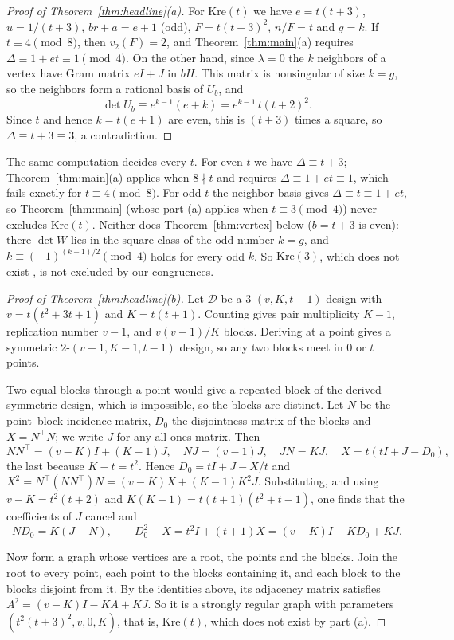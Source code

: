 \documentclass[11pt]{article}
\theoremstyle{definition}
\theoremstyle{remark}
\newcommand{\Kre}{\mathrm{Kre}}
\begin{document}
\begin{proof}[Proof of Theorem~\ref{thm:headline}(a)]
For $\Kre(t)$ we have $e=t(t+3)$, $u=1/(t+3)$, $br+a=e+1$ (odd),
$F=t(t+3)^2$, $n/F=t$ and $g=k$. If $t\equiv4\pmod 8$, then $v_2(F)=2$, and
Theorem~\ref{thm:main}(a) requires $\Delta\equiv1+et\equiv1\pmod 4$.
On the other hand, since $\lambda=0$ the $k$ neighbors of a vertex have Gram
matrix $eI+J$ in $bH$. This matrix is nonsingular of size $k=g$, so the
neighbors form a rational basis of $U_b$, and
\[
 \det U_b\equiv e^{k-1}(e+k)=e^{k-1}\,t(t+2)^2 .
\]
Since $t$ and hence $k=t(e+1)$ are even, this is $(t+3)$ times a square, so
$\Delta\equiv t+3\equiv3$, a contradiction.
\end{proof}

The same computation decides every $t$. For even $t$ we have
$\Delta\equiv t+3$; Theorem~\ref{thm:main}(a) applies when $8\nmid t$ and
requires $\Delta\equiv1+et\equiv1$, which fails exactly for $t\equiv4\pmod 8$.
For odd $t$ the neighbor basis gives $\Delta\equiv t\equiv1+et$, so
Theorem~\ref{thm:main} (whose part (a) applies when $t\equiv3\pmod 4$) never excludes
$\Kre(t)$. Neither does Theorem~\ref{thm:vertex} below ($b=t+3$ is even):
there $\det W$ lies in the square class of the odd number $k=g$, and
$k\equiv(-1)^{(k-1)/2}\pmod 4$ holds for every odd $k$. So $\Kre(3)$, which
does not exist \cite{GM,KO}, is not excluded by our congruences.

\begin{proof}[Proof of Theorem~\ref{thm:headline}(b)]
Let $\mathcal D$ be a $3$-$(v,K,t-1)$ design with $v=t(t^2+3t+1)$ and
$K=t(t+1)$. Counting gives pair multiplicity $K-1$, replication number $v-1$,
and $v(v-1)/K$ blocks. Deriving at a point gives a symmetric
$2$-$(v-1,K-1,t-1)$ design, so any two blocks meet in $0$ or $t$ points.

Two equal blocks through a point would give a repeated block of the
derived symmetric design, which is impossible, so the blocks are distinct.
Let $N$ be the point--block incidence matrix, $D_0$ the disjointness matrix
of the blocks and $X=N^\top N$; we write $J$ for any all-ones matrix. Then
\[
 NN^\top=(v-K)I+(K-1)J,\quad NJ=(v-1)J,\quad JN=KJ,\quad X=t(tI+J-D_0),
\]
the last because $K-t=t^2$. Hence $D_0=tI+J-X/t$ and
$X^2=N^\top(NN^\top)N=(v-K)X+(K-1)K^2J$. Substituting, and using
$v-K=t^2(t+2)$ and $K(K-1)=t(t+1)(t^2+t-1)$, one finds that the coefficients
of $J$ cancel and
\[
 ND_0=K(J-N),\qquad D_0^2+X=t^2I+(t+1)X=(v-K)I-KD_0+KJ .
\]

Now form a graph whose vertices are a root, the points and the blocks. Join
the root to every point, each point to the blocks containing it, and each
block to the blocks disjoint from it. By the identities above, its adjacency
matrix satisfies $A^2=(v-K)I-KA+KJ$. So it is a strongly regular graph with
parameters $(t^2(t+3)^2,v,0,K)$, that is, $\Kre(t)$, which does not exist by
part (a).
\end{proof}
\end{document}
